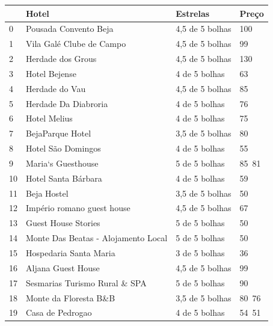 \documentclass[a4paper,10pt]{article}
\begin{document}
\begin{table}[!ht]
  \centering
  \begin{tabular}{|l|l|l|l|}
    \hline
    ~  & Hotel                               & Estrelas        & Preço \\ \hline
    0  & Pousada Convento Beja               & 4,5 de 5 bolhas & 100   \\ \hline
    1  & Vila Galé Clube de Campo            & 4,5 de 5 bolhas & 99    \\ \hline
    2  & Herdade dos Grous                   & 4,5 de 5 bolhas & 130   \\ \hline
    3  & Hotel Bejense                       & 4 de 5 bolhas   & 63    \\ \hline
    4  & Herdade do Vau                      & 4,5 de 5 bolhas & 85    \\ \hline
    5  & Herdade Da Diabroria                & 4 de 5 bolhas   & 76    \\ \hline
    6  & Hotel Melius                        & 4 de 5 bolhas   & 75    \\ \hline
    7  & BejaParque Hotel                    & 3,5 de 5 bolhas & 80    \\ \hline
    8  & Hotel São Domingos                  & 4 de 5 bolhas   & 55    \\ \hline
    9  & Maria`s Guesthouse                  & 5 de 5 bolhas   & 85 81 \\ \hline
    10 & Hotel Santa Bárbara                 & 4 de 5 bolhas   & 59    \\ \hline
    11 & Beja Hostel                         & 3,5 de 5 bolhas & 50    \\ \hline
    12 & Império romano guest house          & 4,5 de 5 bolhas & 67    \\ \hline
    13 & Guest House Stories                 & 5 de 5 bolhas   & 50    \\ \hline
    14 & Monte Das Beatas - Alojamento Local & 5 de 5 bolhas   & 50    \\ \hline
    15 & Hospedaria Santa Maria              & 3 de 5 bolhas   & 36    \\ \hline
    16 & Aljana Guest House                  & 4,5 de 5 bolhas & 99    \\ \hline
    17 & Sesmarias Turismo Rural \& SPA      & 5 de 5 bolhas   & 90    \\ \hline
    18 & Monte da Floresta B\&B              & 3,5 de 5 bolhas & 80 76 \\ \hline
    19 & Casa de Pedrogao                    & 4 de 5 bolhas   & 54 51 \\ \hline

\end{tabular}
\end{table}
\end{document}
